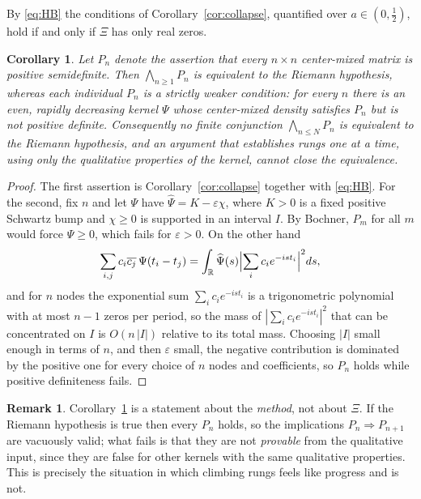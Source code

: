\documentclass[11pt,a4paper]{amsart}
\theoremstyle{plain}
\newtheorem{corollary}[theorem]{Corollary}
\theoremstyle{definition}
\newtheorem{remark}[theorem]{Remark}
\newcommand{\RR}{\mathbb{R}}
\newcommand{\Xii}{\Xi}
\begin{document}
By \eqref{eq:HB} the conditions of Corollary~\ref{cor:collapse}, quantified over $a\in(0,\tfrac12)$,
hold if and only if $\Xii$ has only real zeros.

\begin{corollary}\label{cor:ladder}
Let $P_n$ denote the assertion that every $n\times n$ center-mixed matrix is positive semidefinite.
Then $\bigwedge_{n\ge1}P_n$ is equivalent to the Riemann hypothesis, whereas each individual $P_n$
is a strictly weaker condition: for every $n$ there is an even, rapidly decreasing kernel $\Psi$
whose center-mixed density satisfies $P_n$ but is not positive definite. Consequently no finite
conjunction $\bigwedge_{n\le N}P_n$ is equivalent to the Riemann hypothesis, and an argument that
establishes rungs one at a time, using only the qualitative properties of the kernel, cannot close
the equivalence.
\end{corollary}

\begin{proof}
The first assertion is Corollary~\ref{cor:collapse} together with \eqref{eq:HB}. For the second, fix
$n$ and let $\Psi$ have $\widehat\Psi=K-\varepsilon\chi$, where $K>0$ is a fixed positive
Schwartz bump and $\chi\ge0$ is supported in an interval $I$. By Bochner, $P_m$ for all $m$ would
force $\widehat\Psi\ge0$, which fails for $\varepsilon>0$. On the other hand
\[
  \sum_{i,j}c_i\overline{c_j}\,\Psi(t_i-t_j)
  =\int_\RR\widehat\Psi(s)\Bigl|\sum_i c_ie^{-ist_i}\Bigr|^2ds ,
\]
and for $n$ nodes the exponential sum $\sum_ic_ie^{-ist_i}$ is a trigonometric polynomial with at
most $n-1$ zeros per period, so the mass of $|\sum_ic_ie^{-ist_i}|^2$ that can be concentrated on
$I$ is $O(n\,|I|)$ relative to its total mass. Choosing $|I|$ small enough in terms of $n$, and then
$\varepsilon$ small, the negative contribution is dominated by the positive one for every choice of
$n$ nodes and coefficients, so $P_n$ holds while positive definiteness fails.
\end{proof}

\begin{remark}
Corollary~\ref{cor:ladder} is a statement about the \emph{method}, not about $\Xii$. If the Riemann
hypothesis is true then every $P_n$ holds, so the implications $P_n\Rightarrow P_{n+1}$ are
vacuously valid; what fails is that they are not \emph{provable} from the qualitative input, since
they are false for other kernels with the same qualitative properties. This is precisely the
situation in which climbing rungs feels like progress and is not.
\end{remark}
\end{document}
